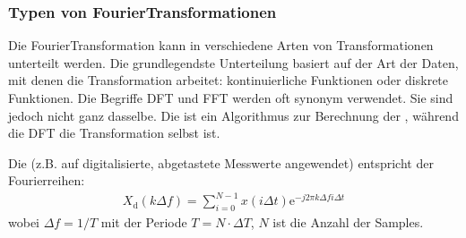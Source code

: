 \documentclass[letterpaper,10pt,english]{jupyterBook}
\begin{document}
\subsubsection{Typen von Fourier\sphinxhyphen{}Transformationen}
\label{\detokenize{content/3_FourierAnalyse:typen-von-fourier-transformationen}}
\sphinxAtStartPar
Die Fourier\sphinxhyphen{}Transformation kann in verschiedene Arten von Transformationen unterteilt werden. Die grundlegendste Unterteilung basiert auf der Art der Daten, mit denen die Transformation arbeitet: kontinuierliche Funktionen oder diskrete Funktionen.
Die Begriffe DFT und FFT werden oft synonym verwendet. Sie sind jedoch nicht ganz dasselbe. Die  ist ein Algorithmus zur Berechnung der , während die DFT die Transformation selbst ist.

\sphinxAtStartPar
Die  (z.B. auf digitalisierte, abgetastete Messwerte angewendet) entspricht der Fourierreihen:
\begin{equation*}
\begin{split}X_\mathrm d (k \Delta f) = \sum_{i = 0}^{N-1} x(i\Delta t) \mathrm e^{-j 2\pi  k \Delta f i \Delta t}\end{split}
\end{equation*}
\sphinxAtStartPar
wobei \(\Delta f = 1/T\) mit der Periode \(T = N\cdot \Delta T\), \(N\) ist die Anzahl der Samples.
\end{document}
